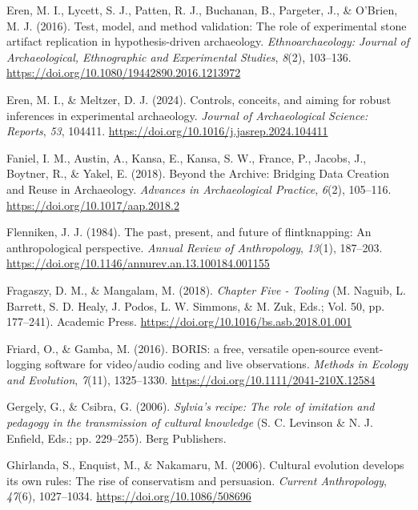 \documentclass[
  11pt,
  letterpaper,
  DIV=11,
  numbers=noendperiod]{scrartcl}
\newlength{\cslhangindent}
\newenvironment{CSLReferences}[2] %
 {\begin{list}{}{%
  \setlength{\itemindent}{0pt}
  \setlength{\leftmargin}{0pt}
  \setlength{\parsep}{0pt}
  \ifodd #1
   \setlength{\leftmargin}{\cslhangindent}
   \setlength{\itemindent}{-1\cslhangindent}
  \fi
  \setlength{\itemsep}{#2\baselineskip}}}
 {\end{list}}
\begin{document}
\begin{CSLReferences}{1}{0}
Eren, M. I., Lycett, S. J., Patten, R. J., Buchanan, B., Pargeter, J.,
\& O'Brien, M. J. (2016). Test, model, and method validation: The role
of experimental stone artifact replication in hypothesis-driven
archaeology. \emph{Ethnoarchaeology: Journal of Archaeological,
Ethnographic and Experimental Studies}, \emph{8}(2), 103--136.
\url{https://doi.org/10.1080/19442890.2016.1213972}

Eren, M. I., \& Meltzer, D. J. (2024). Controls, conceits, and aiming
for robust inferences in experimental archaeology. \emph{Journal of
Archaeological Science: Reports}, \emph{53}, 104411.
\url{https://doi.org/10.1016/j.jasrep.2024.104411}

Faniel, I. M., Austin, A., Kansa, E., Kansa, S. W., France, P., Jacobs,
J., Boytner, R., \& Yakel, E. (2018). Beyond the Archive: Bridging Data
Creation and Reuse in Archaeology. \emph{Advances in Archaeological
Practice}, \emph{6}(2), 105--116.
\url{https://doi.org/10.1017/aap.2018.2}

Flenniken, J. J. (1984). The past, present, and future of flintknapping:
An anthropological perspective. \emph{Annual Review of Anthropology},
\emph{13}(1), 187--203.
\url{https://doi.org/10.1146/annurev.an.13.100184.001155}

Fragaszy, D. M., \& Mangalam, M. (2018). \emph{Chapter Five - Tooling}
(M. Naguib, L. Barrett, S. D. Healy, J. Podos, L. W. Simmons, \& M. Zuk,
Eds.; Vol. 50, pp. 177--241). Academic Press.
\url{https://doi.org/10.1016/bs.asb.2018.01.001}

Friard, O., \& Gamba, M. (2016). BORIS: a free, versatile open-source
event-logging software for video/audio coding and live observations.
\emph{Methods in Ecology and Evolution}, \emph{7}(11), 1325--1330.
\url{https://doi.org/10.1111/2041-210X.12584}

Gergely, G., \& Csibra, G. (2006). \emph{Sylvia's recipe: The role of
imitation and pedagogy in the transmission of cultural knowledge} (S. C.
Levinson \& N. J. Enfield, Eds.; pp. 229--255). Berg Publishers.

Ghirlanda, S., Enquist, M., \& Nakamaru, M. (2006). Cultural evolution
develops its own rules: The rise of conservatism and persuasion.
\emph{Current Anthropology}, \emph{47}(6), 1027--1034.
\url{https://doi.org/10.1086/508696}


\end{CSLReferences}
\end{document}
